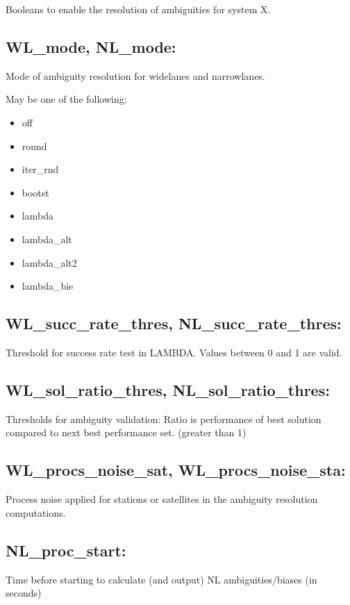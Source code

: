 Booleans to enable the resolution of ambiguities for system X.


\subsection*{WL\_mode, NL\_mode:}

Mode of ambiguity resolution for widelanes and narrowlanes.

May be one of the following:
\begin{itemize}
\item off
\item round
\item iter\_rnd
\item bootst
\item lambda
\item lambda\_alt
\item lambda\_alt2
\item lambda\_bie
\end{itemize}


\subsection*{WL\_succ\_rate\_thres, NL\_succ\_rate\_thres:}

Threshold for success rate test in LAMBDA. Values between 0 and 1 are valid.


\subsection*{WL\_sol\_ratio\_thres, NL\_sol\_ratio\_thres:}

Thresholds for ambiguity validation: Ratio is performance of best solution compared to next best performance set. (greater than 1)


\subsection*{WL\_procs\_noise\_sat, WL\_procs\_noise\_sta:}

Process noise applied for stations or satellites in the ambiguity resolution computations.


\subsection*{NL\_proc\_start:}

Time before starting to calculate (and output) NL ambiguities/biases (in seconds)


